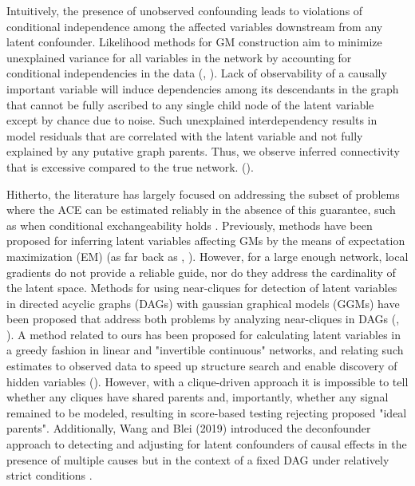 \documentclass{article}
\begin{document}
Intuitively, the presence of unobserved confounding leads to violations of conditional independence among the affected variables downstream from any latent confounder.  Likelihood methods for GM construction aim to minimize unexplained variance for all variables in the network by accounting for conditional independencies in the data (\cite{pearl_causality:_2000}, \cite{friedman_being_2013}).  Lack of observability of a causally important variable will induce dependencies among its descendants in the graph that cannot be fully ascribed to any single child node of the latent variable except by chance due to noise.  Such unexplained interdependency results in model residuals that are correlated with the latent variable and not fully explained by any putative graph parents. Thus, we observe inferred connectivity that is excessive compared to the true network.  (\cite{elidan_discovering_2001}).  


Hitherto, the literature has largely focused on addressing the subset of problems where the ACE can be estimated reliably in the absence of this guarantee, such as when conditional exchangeability holds \cite{hernan_estimating_2006}.  Previously, methods have been proposed for inferring latent variables affecting GMs by the means of expectation maximization (EM) (as far back as \cite{friedman1997learning}, \cite{friedman1998bayesian}).  However, for a large enough network, local gradients do not provide a reliable guide, nor do they address the cardinality of the latent space.  Methods for using near-cliques for detection of latent variables in directed acyclic graphs (DAGs) with gaussian graphical models (GGMs) have been proposed that address both problems by analyzing near-cliques in DAGs (\cite{elidan_discovering_2001}, \cite{silva_learning_2006}).  A method related to ours has been proposed for calculating latent variables in a greedy fashion in linear and "invertible continuous" networks, and relating such estimates to observed data to speed up structure search and enable discovery of hidden variables (\cite{elidan_ideal_2007}). However, with a clique-driven approach it is impossible to tell whether any cliques have shared parents and, importantly, whether any signal remained to be modeled, resulting in score-based testing rejecting proposed "ideal parents". Additionally, Wang and Blei (2019) introduced the deconfounder approach to detecting and adjusting for latent confounders of causal effects in the presence of multiple causes but in the context of a fixed DAG under relatively strict conditions \cite{wang_deconfounder_2019}. 
\end{document}
